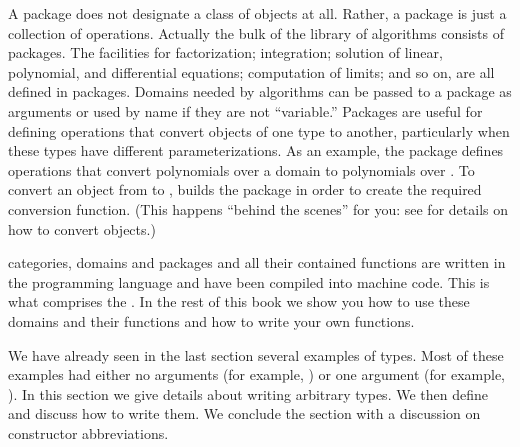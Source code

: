 A package does not designate a class of objects at all.
Rather, a package is just a collection of operations.
Actually the bulk of the \Language{} library of algorithms consists
of packages.
The facilities for factorization; integration; solution of linear,
polynomial, and differential equations; computation of limits; and so
on, are all defined in packages.
Domains needed by algorithms can be passed to a package as arguments or
used by name if they are not ``variable.''
Packages are useful for defining operations that convert objects of one
type to another, particularly when these types have different
parameterizations.
As an example, the package  defines
operations that convert polynomials over a domain  to polynomials
over .
To convert an object from  to
, \Language{} builds the package
 in order to create the
required conversion function.
(This happens ``behind the scenes'' for you: see 
for details on how to convert objects.)

\Language{} categories, domains and packages and all their contained
functions are written in the \Language{} programming language and have
been compiled into machine code.
This is what comprises the \Language{} .
In the rest of this book we show you how to use these domains and
their functions and how to write your own functions.

%

We have already seen in
the last section
several examples of types.
Most of these examples had either no arguments (for example,
) or one argument (for example,
).
In this section we give details about writing arbitrary types.
We then define  and discuss how to write
them.
We conclude the section with a discussion on constructor
abbreviations.

